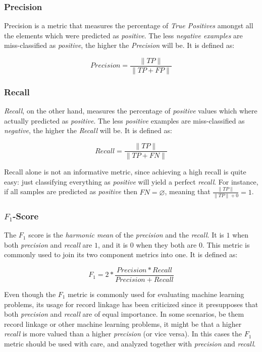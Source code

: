 \documentclass[epsfig,a4paper,11pt,titlepage,twoside,openany]{book}
\begin{document}
\subsubsection{Precision}
\label{sec:evaluation-metric-precision}

Precision is a metric that measures the percentage of \textit{True Positives}
amongst all the elements which were predicted as \textit{positive}. The less \textit{negative examples} are miss-classified as \textit{positive}, the higher the
\textit{Precision} will be. It is defined as:

$$
Precision = \frac{\|TP\|}{\|TP + FP\|}
$$
  


\subsubsection{Recall}
\label{sec:evaluation-metric-recall}

\textit{Recall}, on the other hand, measures the percentage of \textit{positive} values which where actually predicted as \textit{positive}. The less \textit{positive} examples are miss-classified as \textit{negative}, the higher the
\textit{Recall} will be. It is defined as:

$$
Recall = \frac{\|TP\|}{\|TP + FN\|}
$$

Recall alone is not an informative metric, since achieving a high recall is
quite easy: just classifying everything as \textit{positive} will yield a
perfect \textit{recall}. For instance, if all samples are predicted as \textit{positive} then $FN = \varnothing$, meaning that $\frac{\|TP\|}{\|TP\| + 0} = 1$.



\subsubsection{$F_1$-Score}
\label{sec:evaluation-metric-f1}

The $F_1$ score is the \textit{harmonic mean} of the \textit{precision} and the
\textit{recall}. It is $1$ when both \textit{precision} and \textit{recall} are
$1$, and it is $0$ when they both are $0$. This metric is commonly used to join
its two component metrics into one. It is defined as:

$$
F_1 = 2 * \frac{Precision * Recall}{Precision + Recall}
$$

Even though the $F_1$ metric is commonly used for evaluating machine learning problems, its usage for record linkage has been criticized \cite{hand17_note_using_f_measur_evaluat} since it presupposes that both \textit{precision} and \textit{recall} are of equal importance. In some scenarios, be them record linkage or other machine learning problems, it might be that a higher \textit{recall} is more valued than a higher \textit{precision} (or vice versa). In this cases the $F_1$ metric should be used with care, and analyzed together with \textit{precision} and \textit{recall}. 
\end{document}
